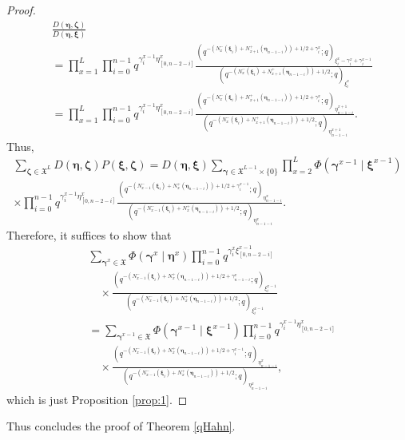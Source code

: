 \documentclass{ximera}
\begin{document}
\begin{proof}
\begin{equation*}
\begin{array}{cl}
    &\frac{D (\boldsymbol\eta,\boldsymbol\zeta)}{D(\boldsymbol\eta,\boldsymbol\xi)}   \\ & =\prod_{x=1}^L\prod_{i=0}^{n-1}q^{\gamma_i^{x-1}\eta_{[0,n-2-i]}^{x}}\frac{\left(q^{-\left(N_{x}^-(\boldsymbol\xi_i)+N_{x+1}^+(\boldsymbol\eta_{n-1-i})\right)+1/2+\gamma^x_i};q\right)_{\xi_i^{x}-\gamma_i^x+\gamma_i^{x-1}}}{\left(q^{-\left(N_{x}^-(\boldsymbol\xi_i)+N_{x+1}^+(\boldsymbol\eta_{n-1-i})\right)+1/2};q\right)_{\xi_i^{x}}}\\ 
     & =\prod_{x=1}^L\prod_{i=0}^{n-1}q^{\gamma_i^{x-1}\eta_{[0,n-2-i]}^{x}}\frac{\left(q^{-\left(N_{x}^-(\boldsymbol\xi_i)+N_{x+1}^+(\boldsymbol\eta_{n-1-i})\right)+1/2+\gamma_i^x};q\right)_{\eta_{n-1-i}^{x+1}}}{\left(q^{-\left(N_{x}^-(\boldsymbol\xi_i)+N_{x+1}^+(\boldsymbol\eta_{n-1-i})\right)+1/2};q\right)_{\eta_{n-1-i}^{x+1}}}.
\end{array}
\end{equation*}
Thus,
\begin{multline*}
    \sum_{\boldsymbol\zeta\in\mathfrak{X}^L}D(\boldsymbol\eta,\boldsymbol\zeta)P(\boldsymbol\xi,\boldsymbol\zeta)=D(\boldsymbol\eta,\boldsymbol\xi)\sum_{\boldsymbol\gamma\in  \mathfrak{X}^{L-1}\times\{0\} } \prod_{x=2}^{L}
   \Phi(\boldsymbol\gamma^{x-1}\mid\boldsymbol\xi^{x-1})\\\times\prod_{i=0}^{n-1}q^{\gamma_i^{x-1}\eta_{[0,n-2-i]}^{x}}\frac{\left(q^{-\left(N_{x-1}^-(\boldsymbol\xi_i)+N_{x}^+(\boldsymbol\eta_{n-1-i})\right)+1/2+\gamma_i^{x-1}};q\right)_{\eta_{n-1-i}^{x}}}{\left(q^{-\left(N_{x-1}^-(\boldsymbol\xi_i)+N_{x}^+(\boldsymbol\eta_{n-1-i})\right)+1/2};q\right)_{\eta_{n-1-i}^{x}}}  .
\end{multline*}
Therefore, it suffices to show that
\begin{align*}
   & \sum_{\boldsymbol\gamma^x\in  \mathfrak{X} }\Phi(\boldsymbol\gamma^x\mid\boldsymbol\eta^x) \prod_{i=0}^{n-1}q^{\gamma_i^{x}\xi_{[0,n-2-i]}^{x-1}}\\
    &\quad\times\frac{\left(q^{-\left(N_{x-1}^-(\boldsymbol\xi_i)+N_{x}^+(\boldsymbol\eta_{n-1-i})\right)+1/2+\gamma_{n-1-i}^{x}};q\right)_{\xi_i^{x-1}}}{\left(q^{-\left(N_{x-1}^-(\boldsymbol\xi_i)+N_{x}^+(\boldsymbol\eta_{n-1-i})\right)+1/2};q\right)_{\xi_i^{x-1}}}\\
    & =\sum_{\boldsymbol\gamma^{x-1}\in  \mathfrak{X} }\Phi(\boldsymbol\gamma^{x-1}\mid\boldsymbol\xi^{x-1})\prod_{i=0}^{n-1}q^{\gamma_i^{x-1}\eta_{[0,n-2-i]}^{x}} \\ &\quad\times\frac{\left(q^{-\left(N_{x-1}^-(\boldsymbol\xi_i)+N_{x}^+(\boldsymbol\eta_{n-1-i})\right)+1/2+\gamma_i^{x-1}};q\right)_{\eta_{n-1-i}^{x}}}{\left(q^{-\left(N_{x-1}^-(\boldsymbol\xi_i)+N_{x}^+(\boldsymbol\eta_{n-1-i})\right)+1/2};q\right)_{\eta_{n-1-i}^{x}}} ,
\end{align*}
which is just Proposition \ref{prop:1}.
\end{proof}
Thus concludes the proof of Theorem \ref{qHahn}.
\end{document}
